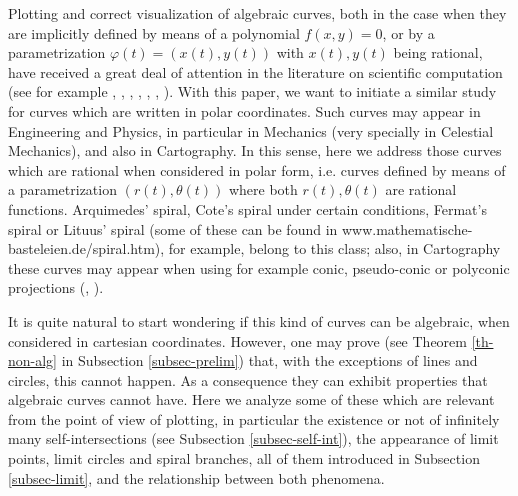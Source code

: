 \documentclass{elsart}
\begin{document}
Plotting and correct visualization of algebraic curves, both in the case when they are implicitly defined by means of a polynomial $f(x,y)=0$, or by a parametrization $\varphi(t)=(x(t),y(t))$ with $x(t),y(t)$ being rational, have received a great deal of attention in the literature on scientific computation (see for example \cite{JGDT}, \cite{Cheng}, \cite{Eigen}, \cite{Emel}, \cite{Lalo}, \cite{Hong}, \cite{seidel}). With this paper, we want to initiate a similar study for curves which are written in polar coordinates. Such curves may appear in Engineering and Physics, in particular in Mechanics (very specially in Celestial Mechanics), and also in Cartography. In this sense, here we address those curves which are rational when considered in polar form, i.e. curves defined by means of a parametrization $(r(t),\theta(t))$ where both $r(t),\theta(t)$ are rational functions. Arquimedes' spiral, Cote's spiral under certain conditions, Fermat's spiral or Lituus' spiral (some of these can be found in www.mathematische-basteleien.de/spiral.htm), for example, belong to this class; also, in Cartography these curves may appear when using for example conic, pseudo-conic or polyconic projections (\cite{Buga}, \cite{Sny}).

It is quite natural to start wondering if this kind of curves can be algebraic, when considered in cartesian coordinates. However, one may prove (see Theorem \ref{th-non-alg} in Subsection \ref{subsec-prelim}) that, with the exceptions of lines and circles, this cannot happen. As a consequence they can exhibit properties that algebraic curves cannot have. Here we analyze some of these which are relevant from the point of view of plotting, in particular the existence or not of infinitely many self-intersections (see Subsection \ref{subsec-self-int}), the appearance of limit points, limit circles and spiral branches, all of them introduced in Subsection \ref{subsec-limit}, and the relationship between both phenomena.
\end{document}
